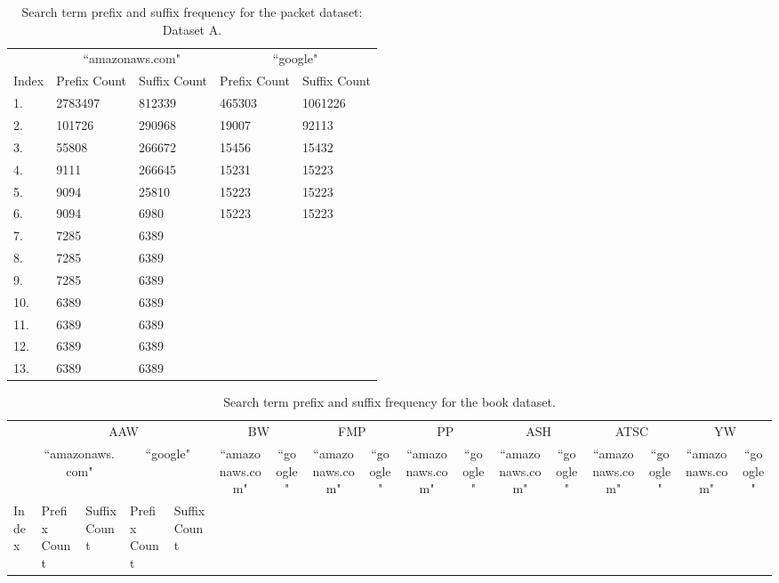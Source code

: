 \documentclass{article}
\begin{document}
\begin{table}[hbt]
  \centering
  \begin{tabular}{l|l|l||l|l}
    & \multicolumn{2}{c}{``amazonaws.com"} & \multicolumn{2}{c}{``google"} \\
    Index & Prefix Count & Suffix Count & Prefix Count & Suffix Count \\
    \hline
    1. & 2783497 & 812339 & 465303 & 1061226\\
    2. & 101726 & 290968 & 19007 & 92113\\
    3. & 55808 & 266672 & 15456 & 15432\\
    4. & 9111 & 266645 & 15231 & 15223\\
    5. & 9094 & 25810 & 15223 & 15223\\
    6. & 9094 & 6980 & 15223 & 15223\\
    7. & 7285 & 6389 & &\\
    8. & 7285 & 6389 & &\\
    9. & 7285 & 6389 & &\\
    10. & 6389 & 6389 & &\\
    11. & 6389 & 6389 & &\\
    12. & 6389 & 6389 & &\\
    13. & 6389 & 6389 & &
  \end{tabular}
  \caption{Search term prefix and suffix frequency for the packet dataset: Dataset A.}
\end{table}

\begin{table}[hbt]
  \centering
  \begin{tabular}{l|l|l|l|l|l|l|l|l|l|l|l|l|l|l|l|l|l|l|l|l|l|l|l|l}
    & \multicolumn{4}{c}{AAW} & \multicolumn{4}{c}{BW} & \multicolumn{4}{c}{FMP} & \multicolumn{4}{c}{PP} & \multicolumn{4}{c}{ASH} & \multicolumn{4}{c}{ATSC} & \multicolumn{4}{c}{YW} \\
    & \multicolumn{2}{c}{``amazonaws.com"} & \multicolumn{2}{c}{``google"} & \multicolumn{2}{c}{``amazonaws.com"} & \multicolumn{2}{c}{``google"} & \multicolumn{2}{c}{``amazonaws.com"} & \multicolumn{2}{c}{``google"} & \multicolumn{2}{c}{``amazonaws.com"} & \multicolumn{2}{c}{``google"} & \multicolumn{2}{c}{``amazonaws.com"} & \multicolumn{2}{c}{``google"} & \multicolumn{2}{c}{``amazonaws.com"} & \multicolumn{2}{c}{``google"} & \multicolumn{2}{c}{``amazonaws.com"} & \multicolumn{2}{c}{``google"} \\
    Index & Prefix Count & Suffix Count & Prefix Count & Suffix Count \\
    \hline
  \end{tabular}
  \caption{Search term prefix and suffix frequency for the book dataset.}
\end{table}
\end{document}
